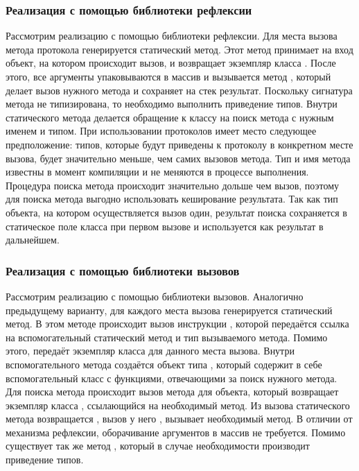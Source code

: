 \subsubsection{Реализация с помощью библиотеки рефлексии}
Рассмотрим реализацию с помощью библиотеки рефлексии. Для места вызова метода протокола генерируется статический метод. Этот метод принимает на вход объект, на котором происходит вызов, и возвращает экземпляр класса . После этого, все аргументы упаковываются в массив и вызывается метод , который делает вызов нужного метода и сохраняет на стек результат. Поскольку сигнатура метода  не типизирована, то необходимо выполнить приведение типов. Внутри статического метода делается обращение к классу на поиск метода с нужным именем и типом. При использовании протоколов имеет место следующее предположение: типов, которые будут приведены к протоколу в конкретном месте вызова, будет значительно меньше, чем самих вызовов метода. Тип и имя метода известны в момент компиляции и не меняются в процессе выполнения. Процедура поиска метода происходит значительно дольше чем вызов, поэтому для поиска метода выгодно использовать кеширование результата. Так как тип объекта, на котором осуществляется вызов один, результат поиска сохраняется в статическое поле класса при первом вызове и используется как результат в дальнейшем.

\subsubsection{Реализация с помощью библиотеки вызовов}
Рассмотрим реализацию с помощью библиотеки вызовов. Аналогично предыдущему варианту, для каждого места вызова генерируется статический метод. В этом методе происходит вызов инструкции , которой передаётся ссылка на вспомогательный статический метод и тип вызываемого метода. Помимо этого,  передаёт экземпляр класса  для данного места вызова. Внутри вспомогательного метода создаётся объект типа , который содержит в себе вспомогательный класс с функциями, отвечающими за поиск нужного метода. Для поиска метода происходит вызов метода  для объекта, который возвращает экземпляр класса , ссылающийся на необходимый метод. Из вызова статического метода возвращается , вызов у него , вызывает необходимый метод. В отличии от механизма рефлексии, оборачивание аргументов в массив не требуется. Помимо  существует так же метод , который в случае необходимости производит приведение типов.

